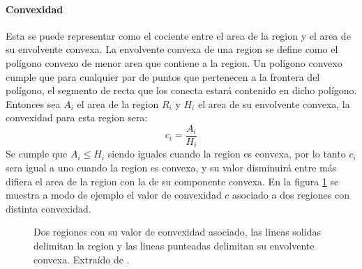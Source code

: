 \paragraph{Convexidad}
Esta se puede representar como el cociente entre el area de la region y el area de su envolvente convexa. La envolvente convexa de una region se define como el polígono convexo de menor area que contiene a la region. Un polígono convexo cumple que para cualquier par de puntos que pertenecen a la frontera del polígono, el segmento de recta que los conecta estará contenido en dicho polígono. Entonces sea $A_i$ el area de la region $R_i$ y $H_i$ el area de su envolvente convexa, la convexidad para esta region sera:
\begin{equation}
  c_i=\frac{A_i}{H_i}
\end{equation}
Se cumple que $A_i \leq H_i$ siendo iguales cuando la region es convexa, por lo tanto $c_i$ sera igual a uno cuando la region es convexa, y su valor disminuirá entre más difiera el area de la region con la de su componente convexa. En la figura \ref{fig:ejemplConvexidad} se muestra a modo de ejemplo el valor de convexidad $c$ asociado a dos regiones con distinta convexidad.
\begin{figure}[H]
  \centering
  \hspace{2cm}
  \qquad
  \caption{Dos regiones con su valor de convexidad asociado, las lineas solidas delimitan la region y las lineas punteadas delimitan su envolvente convexa. Extraído de \cite{Liu2015}.}\label{fig:ejemplConvexidad}
\end{figure}

